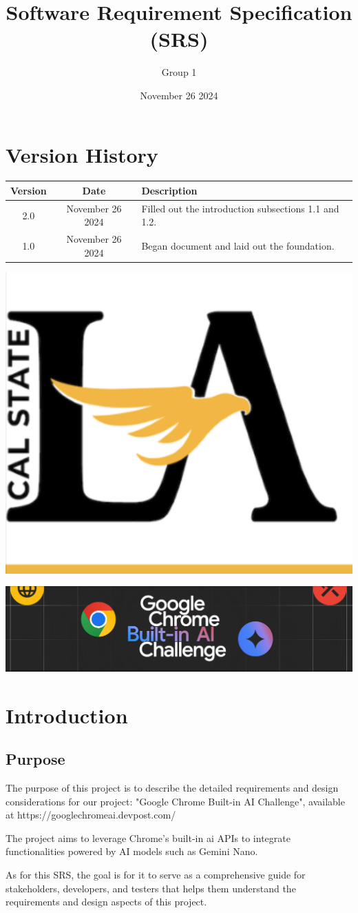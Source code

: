 \documentclass{article}
\title{Software Requirement Specification (SRS)}
\author{Group 1 }
\date{November 26 2024}
\begin{document}
\maketitle  
\pagebreak

\tableofcontents
\pagebreak

\section*{Version History}
\begin{longtable}{|c|c|p{10cm}|}
\hline
\textbf{Version} & \textbf{Date} & \textbf{Description} \\ \hline
2.0 & November 26 2024 & Filled out the introduction subsections 1.1 and 1.2.  \\ \hline
1.0 & November 26 2024 & Began document and laid out the foundation.  \\ \hline
\end{longtable}
\pagebreak

\includegraphics[width=0.3\linewidth]{../logo/csula.png} 

\includegraphics[width=0.3\linewidth]{../logo/chromeai.png} 

\section{Introduction}
\subsection{Purpose}
The purpose of this project is to describe the detailed requirements and design considerations for our project: "Google Chrome Built-in AI Challenge", available at https://googlechromeai.devpost.com/ 

The project aims to leverage Chrome's built-in \Gls{ai} APIs to integrate functionalities powered by AI models such as Gemini Nano.

As for this SRS, the goal is for it to serve as a comprehensive guide for stakeholders, developers, and testers that helps them understand the requirements and design aspects of this project.
\end{document}
